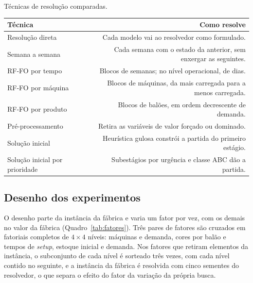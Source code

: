 \documentclass[
    12pt,
    openright,
    oneside,
    a4paper,
    fleqn,
    chapter=TITLE,
    section=TITLE,
    english,
    brazil
]{abntex2}
\begin{document}
\begin{quadro}[htbp]
\small
\caption{Técnicas de resolução comparadas.}
\label{tab:tecnicas}
\begin{tabularx}{\linewidth}{@{}L{5.2cm}R@{}}
\toprule
Técnica & Como resolve \\
\midrule
Resolução direta & Cada modelo vai ao resolvedor como formulado. \\
Semana a semana & Cada semana com o estado da anterior, sem enxergar as seguintes. \\
RF-FO por tempo & Blocos de semanas; no nível operacional, de dias. \\
RF-FO por máquina & Blocos de máquinas, da mais carregada para a menos carregada. \\
RF-FO por produto & Blocos de balões, em ordem decrescente de demanda. \\
Pré-processamento & Retira as variáveis de valor forçado ou dominado. \\
Solução inicial & Heurística gulosa constrói a partida do primeiro estágio. \\
Solução inicial por prioridade & Subestágios por urgência e classe ABC dão a partida. \\
\bottomrule
\end{tabularx}
\end{quadro}

\subsection{Desenho dos experimentos}

O desenho parte da instância da fábrica e varia um fator por vez, com os demais no valor da fábrica (Quadro~\ref{tab:fatores}). Três pares de fatores são cruzados em fatoriais completos de $4 \times 4$ níveis: máquinas e demanda, cores por balão e tempos de \textit{setup}, estoque inicial e demanda. Nos fatores que retiram elementos da instância, o subconjunto de cada nível é sorteado três vezes, com cada nível contido no seguinte, e a instância da fábrica é resolvida com cinco sementes do resolvedor, o que separa o efeito do fator da variação da própria busca.
\end{document}

